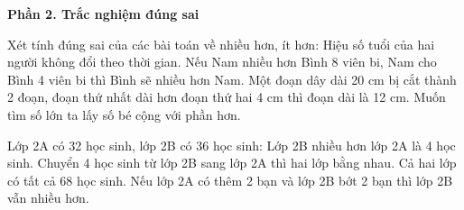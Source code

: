 \textbf{Phần 2. Trắc nghiệm đúng sai}

\begin{ex} %
Xét tính đúng sai của các bài toán về nhiều hơn, ít hơn:
\choiceTF
{\True Hiệu số tuổi của hai người không đổi theo thời gian.}
{Nếu Nam nhiều hơn Bình 8 viên bi, Nam cho Bình 4 viên bi thì Bình sẽ nhiều hơn Nam.}
{\True Một đoạn dây dài 20 cm bị cắt thành 2 đoạn, đoạn thứ nhất dài hơn đoạn thứ hai 4 cm thì đoạn dài là 12 cm.}
{\True Muốn tìm số lớn ta lấy số bé cộng với phần hơn.}
\end{ex}

\begin{ex} %
Lớp 2A có 32 học sinh, lớp 2B có 36 học sinh:
\choiceTF
{\True Lớp 2B nhiều hơn lớp 2A là 4 học sinh.}
{Chuyển 4 học sinh từ lớp 2B sang lớp 2A thì hai lớp bằng nhau.}
{\True Cả hai lớp có tất cả 68 học sinh.}
{Nếu lớp 2A có thêm 2 bạn và lớp 2B bớt 2 bạn thì lớp 2B vẫn nhiều hơn.}
\end{ex}

